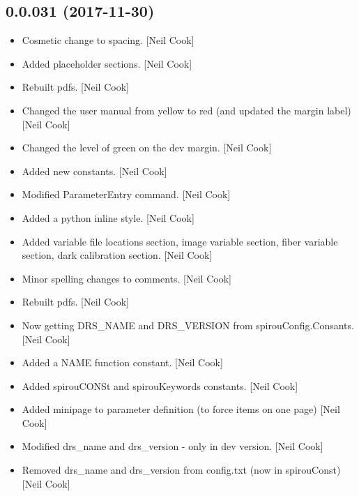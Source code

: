 \documentclass[a4paper,10pt,english]{report}
\begin{document}
\subsection{0.0.031 (2017-11-30)}
\label{\detokenize{misc/changelog:id519}}\begin{itemize}
\item {} 
Cosmetic change to spacing. {[}Neil Cook{]}

\item {} 
Added placeholder sections. {[}Neil Cook{]}

\item {} 
Rebuilt pdfs. {[}Neil Cook{]}

\item {} 
Changed the user manual from yellow to red (and updated the margin
label) {[}Neil Cook{]}

\item {} 
Changed the level of green on the dev margin. {[}Neil Cook{]}

\item {} 
Added new constants. {[}Neil Cook{]}

\item {} 
Modified ParameterEntry command. {[}Neil Cook{]}

\item {} 
Added a python inline style. {[}Neil Cook{]}

\item {} 
Added variable file locations section, image variable section, fiber
variable section, dark calibration section. {[}Neil Cook{]}

\item {} 
Minor spelling changes to comments. {[}Neil Cook{]}

\item {} 
Rebuilt pdfs. {[}Neil Cook{]}

\item {} 
Now getting DRS\_NAME and DRS\_VERSION from spirouConfig.Consants. {[}Neil
Cook{]}

\item {} 
Added a NAME function constant. {[}Neil Cook{]}

\item {} 
Added spirouCONSt and spirouKeywords constants. {[}Neil Cook{]}

\item {} 
Added minipage to parameter definition (to force items on one page)
{[}Neil Cook{]}

\item {} 
Modified drs\_name and drs\_version - only in dev version. {[}Neil Cook{]}

\item {} 
Removed drs\_name and drs\_version from config.txt (now in spirouConst)
{[}Neil Cook{]}

\end{itemize}
\end{document}
